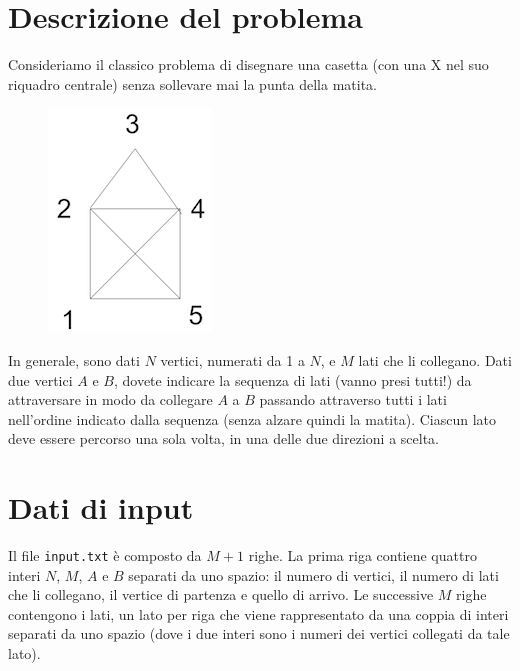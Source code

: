 \documentclass[a4paper,11pt]{article}
\begin{document}
\vspace{0.5cm}



\section*{Descrizione del problema}
   
Consideriamo il classico problema di disegnare una casetta (con una X
nel suo riquadro centrale) senza sollevare mai la punta della
matita. 

\begin{figure}[h!]
  \centering
  \caption{}
  \includegraphics{casetta.png}
\end{figure}

In generale, sono dati $N$ vertici, numerati da 1 a
$N$, e $M$ lati che li collegano. Dati due vertici
$A$ e $B$, dovete indicare la sequenza di lati
(vanno presi tutti!) da attraversare in modo da collegare $A$
a $B$ passando attraverso tutti i lati nell'ordine indicato
dalla sequenza (senza alzare quindi la matita). Ciascun lato deve
essere percorso una sola volta, in una delle due direzioni a scelta.


\section*{Dati di input}
  
Il file \texttt{input.txt} è composto da $M+1$
righe. La prima riga contiene quattro interi $N$,
$M$, $A$ e $B$ separati da uno spazio: il
numero di vertici, il numero di lati che li collegano, il vertice di
partenza e quello di arrivo. Le successive $M$ righe
contengono i lati, un lato per riga che viene rappresentato da una
coppia di interi separati da uno spazio (dove i due interi sono i numeri dei vertici collegati da tale lato).
\end{document}
